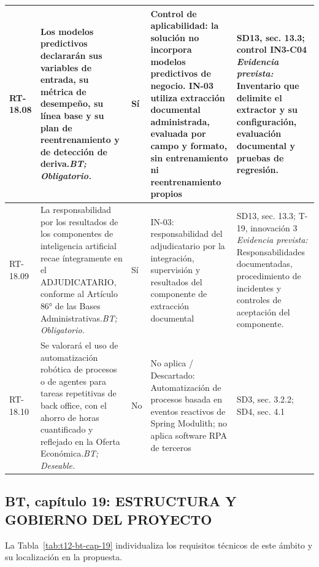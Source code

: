 \begin{paginaHorizontalSynaptix}
\begin{longtable}{|L{0.09\AnchoMatrizTDoce}|L{0.385\AnchoMatrizTDoce}|L{0.065\AnchoMatrizTDoce}|L{0.18\AnchoMatrizTDoce}|L{0.28\AnchoMatrizTDoce}|}
RT-\allowbreak{}18.\allowbreak{}08 &
Los modelos predictivos declararán sus variables de entrada, su métrica de desempeño, su línea base y su plan de reentrenamiento y de detección de deriva.\newline\textit{BT; Obligatorio.} &
Sí &
Control de aplicabilidad: la solución no incorpora modelos predictivos de negocio. IN-03 utiliza extracción documental administrada, evaluada por campo y formato, sin entrenamiento ni reentrenamiento propios &
SD13, sec. 13.3; control IN3-C04 \newline\textit{Evidencia prevista:} Inventario que delimite el extractor y su configuración, evaluación documental y pruebas de regresión. \\ \hline

RT-\allowbreak{}18.\allowbreak{}09 &
La responsabilidad por los resultados de los componentes de inteligencia artificial recae íntegramente en el ADJUDICATARIO, conforme al Artículo 86° de las Bases Administrativas.\newline\textit{BT; Obligatorio.} &
Sí &
IN-03: responsabilidad del adjudicatario por la integración, supervisión y resultados del componente de extracción documental &
SD13, sec. 13.3; T-19, innovación 3 \newline\textit{Evidencia prevista:} Responsabilidades documentadas, procedimiento de incidentes y controles de aceptación del componente. \\ \hline

RT-\allowbreak{}18.\allowbreak{}10 &
Se valorará el uso de automatización robótica de procesos o de agentes para tareas repetitivas de back office, con el ahorro de horas cuantificado y reflejado en la Oferta Económica.\newline\textit{BT; Deseable.} &
No &
No aplica / Descartado: Automatización de procesos basada en eventos reactivos de Spring Modulith; no aplica software RPA de terceros &
SD3, sec. 3.2.2; SD4, sec. 4.1 \\ \hline

\end{longtable}


\subsection*{BT, capítulo 19: ESTRUCTURA Y GOBIERNO DEL PROYECTO}


La Tabla~\ref{tab:t12-bt-cap-19} individualiza los requisitos técnicos de este ámbito y su localización en la propuesta.


\end{paginaHorizontalSynaptix}
